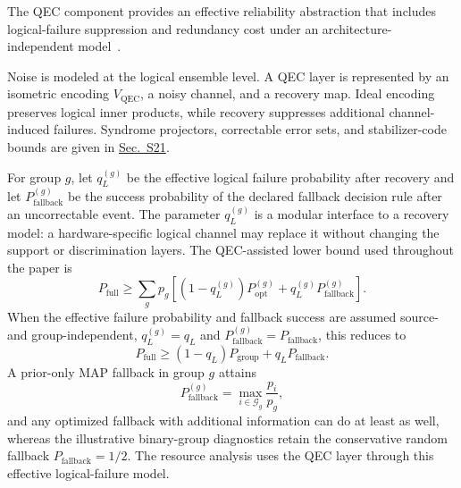 The QEC component provides an effective reliability abstraction that includes logical-failure suppression and redundancy cost under an architecture-independent model~\cite{nielsen2010quantum,terhal2015quantum}.

Noise is modeled at the logical ensemble level. A QEC layer is represented by an isometric encoding $V_{\mathrm{QEC}}$, a noisy channel, and a recovery map. Ideal encoding preserves logical inner products, while recovery suppresses additional channel-induced failures. Syndrome projectors, correctable error sets, and stabilizer-code bounds are given in \hyperref[app:qec_sdp_details]{Sec.~S21}.

For group $g$, let $q_L^{(g)}$ be the effective logical failure probability after recovery and let $P_{\mathrm{fallback}}^{(g)}$ be the success probability of the declared fallback decision rule after an uncorrectable event. The parameter $q_L^{(g)}$ is a modular interface to a recovery model: a hardware-specific logical channel may replace it without changing the support or discrimination layers. The QEC-assisted lower bound used throughout the paper is
\begin{equation}
    P_{\mathrm{full}}
    \ge
    \sum_g p_g\left[(1-q_L^{(g)})P_{\mathrm{opt}}^{(g)}+q_L^{(g)}P_{\mathrm{fallback}}^{(g)}\right].
    \label{eq:full_bound_main}
\end{equation}
When the effective failure probability and fallback success are assumed source- and group-independent, $q_L^{(g)}=q_L$ and $P_{\mathrm{fallback}}^{(g)}=P_{\mathrm{fallback}}$, this reduces to
\begin{equation}
    P_{\mathrm{full}}\ge (1-q_L)P_{\mathrm{group}}+q_LP_{\mathrm{fallback}}.
    \label{eq:full_bound_simple_main}
\end{equation}
A prior-only MAP fallback in group \(g\) attains
\begin{equation}
    P_{\mathrm{fallback}}^{(g)}
    =
    \max_{i\in\mathcal G_g}\frac{p_i}{p_g},
    \label{eq:map_aware_fallback_floor}
\end{equation}
and any optimized fallback with additional information can do at least as well, whereas the illustrative binary-group diagnostics retain the conservative random fallback \(P_{\mathrm{fallback}}=1/2\).
The resource analysis uses the QEC layer through this effective logical-failure model.

